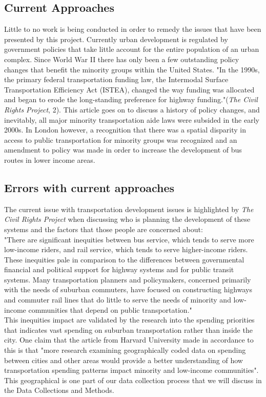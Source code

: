 \documentclass[12pt]{article}
\begin{document}
\begin{multicols}{2}
\section{Current Approaches}
Little to no work is being conducted in order to remedy the issues that have been presented by this project. Currently urban development is regulated by government policies that take little account for the entire population of an urban complex. Since World War II there has only been a few outstanding policy changes that benefit the minority groups within the United States. "In the 1990s, the primary federal transportation funding law, the Intermodal Surface Transportation Efficiency Act (ISTEA), changed the way funding was allocated and began to erode the long-standing preference for highway funding."(\textit{The Civil Rights Project}, 2). This article goes on to discuss a history of policy changes, and inevitably, all major minority transportation aide laws were subsided in the early 2000s. In London however, a recognition that there was a spatial disparity in access to public transportation for minority groups was recognized and an amendment to policy was made in order to increase the development of bus routes in lower income areas.
\subsection{Errors with current approaches}
The current issue with transportation development issues is highlighted by \textit{The Civil Rights Project} when discussing who is planning the development of these systems and the factors that those people are concerned about:\\
"There are significant inequities between bus service, which tends to serve more low-income riders, and rail service, which tends to serve higher-income riders. These inequities pale in comparison to the differences between governmental financial and political support for highway systems and for public transit systems. Many transportation planners and policymakers, concerned primarily with the needs of suburban commuters, have focused on constructing highways and commuter rail lines that do little to serve the needs of minority and low-income communities that depend on public transportation."\\
This inequities impact are validated by the research into the spending priorities that indicates vast spending on suburban transportation rather than inside the city. One claim that the article from Harvard University made in accordance to this is that "more research examining geographically coded data on spending between cities and other areas would provide a better understanding of how transportation spending patterns impact minority and low-income communities". This geographical is one part of our data collection process that we will discuss in the Data Collections and Methods.


\end{multicols}
\end{document}

